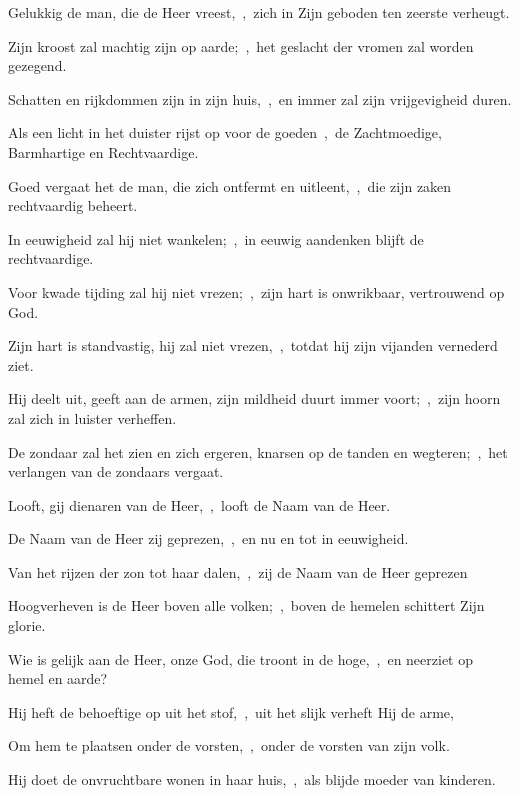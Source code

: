 \documentclass[12pt,twoside,a5paper]{article}
\begin{document}
\begin{halfparskip}

   Gelukkig de man, die de Heer vreest,~\sep\ zich in Zijn geboden ten zeerste verheugt.


  Zijn kroost zal machtig zijn op aarde;~\sep\ het geslacht der vromen zal worden gezegend.

  Schatten en rijkdommen zijn in zijn huis,~\sep\ en immer zal zijn vrijgevigheid duren.

  Als een licht in het duister rijst op voor de goeden~\sep\ de Zachtmoedige, Barmhartige en Rechtvaardige.

  Goed vergaat het de man, die zich ontfermt en uitleent,~\sep\ die zijn zaken rechtvaardig beheert.

  In eeuwigheid zal hij niet wankelen;~\sep\ in eeuwig aandenken blijft de rechtvaardige.

  Voor kwade tijding zal hij niet vrezen;~\sep\ zijn hart is onwrikbaar, vertrouwend op God.

  Zijn hart is standvastig, hij zal niet vrezen,~\sep\ totdat hij zijn vijanden vernederd ziet.

  Hij deelt uit, geeft aan de armen, zijn mildheid duurt immer voort;~\sep\ zijn hoorn zal zich in luister verheffen.

  De zondaar zal het zien en zich ergeren, knarsen op de tanden en wegteren;~\sep\ het verlangen van de zondaars vergaat.

   Looft, gij dienaren van de Heer,~\sep\ looft de Naam van de Heer.

  De Naam van de Heer zij geprezen,~\sep\ en nu en tot in eeuwigheid.

  Van het rijzen der zon tot haar dalen,~\sep\ zij de Naam van de Heer geprezen

  Hoogverheven is de Heer boven alle volken;~\sep\ boven de hemelen schittert Zijn glorie.

  Wie is gelijk aan de Heer, onze God, die troont in de hoge,~\sep\ en neerziet op hemel en aarde?

  Hij heft de behoeftige op uit het stof,~\sep\ uit het slijk verheft Hij de arme,

  Om hem te plaatsen onder de vorsten,~\sep\ onder de vorsten van zijn volk.

  Hij doet de onvruchtbare wonen in haar huis,~\sep\ als blijde moeder van kinderen.


\end{halfparskip}
\end{document}

